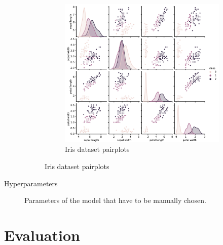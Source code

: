 \begin{description}
\begin{figure}[ht]
\begin{subfigure}{.5\textwidth}
                \centering
                \includegraphics[width=\linewidth]{img/_iris_pairplot.pdf}
                \caption{Iris dataset pairplots}
            \end{subfigure}
        \end{figure}

    \item[Hyperparameters]
        Parameters of the model that have to be manually chosen.
\end{description}


\section{Evaluation}

